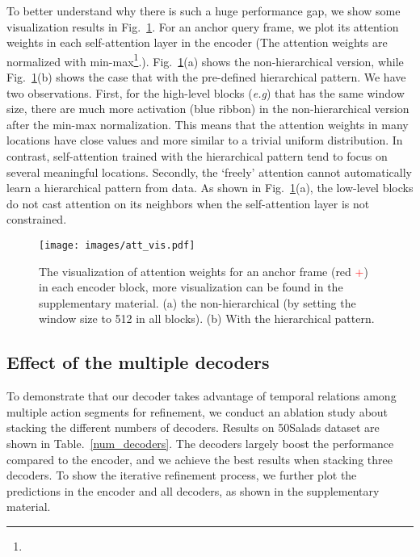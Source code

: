 \documentclass{bmvc2k}
\def\eg{\emph{e.g}\bmvaOneDot}
\begin{document}
To better understand why there is such a huge performance gap, we show some visualization results in Fig.~\ref{att_vis}. For an anchor query frame, we plot its attention weights in each self-attention layer in the encoder (The attention weights are normalized with min-max\footnote{}.). Fig.~\ref{att_vis}(a) shows the non-hierarchical version, while Fig.~\ref{att_vis}(b) shows the case that with the pre-defined hierarchical pattern. We have two observations. First, for the high-level blocks (\eg{block \#9}) that has the same window size, there are much more activation (blue ribbon) in the non-hierarchical version after the min-max normalization. This means that the attention weights in many locations have close values and more similar to a trivial uniform distribution. In contrast, self-attention trained with the hierarchical pattern tend to focus on several meaningful locations. Secondly, the `freely' attention cannot automatically learn a hierarchical pattern from data. As shown in Fig.~\ref{att_vis}(a), the low-level blocks do not cast attention on its neighbors when the self-attention layer is not constrained. 

\begin{figure}[h]
\vspace{-0.4cm}
	\centering
	\texttt{[image: images/att\_vis.pdf]}
	\caption{The visualization of attention weights for an anchor frame (red \textcolor{red}{+}) in each encoder block, more visualization can be found in the supplementary material. (a) the non-hierarchical (by setting the window size to 512 in all blocks). (b) With the hierarchical pattern.}
	\label{att_vis}
    \vspace{-0.3cm}
\end{figure}


\subsection{Effect of the multiple decoders}
To demonstrate that our decoder takes advantage of temporal relations among multiple action segments for refinement, we conduct an ablation study about stacking the different numbers of decoders. Results on 50Salads dataset are shown in Table.~\ref{num_decoders}. The decoders largely boost the performance compared to the encoder, and we achieve the best results when stacking three decoders. To show the iterative refinement process, we further plot the predictions in the encoder and all decoders, as shown in the supplementary material. 
\end{document}

